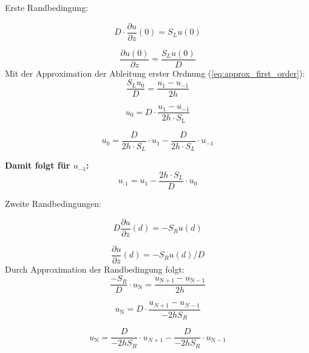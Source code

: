 Erste Randbedingung:

\begin{equation}
	D\cdot \frac{\partial u}{\partial z}(0)=S_Lu(0)
\end{equation}

\begin{equation}
	\frac{\partial u(0)}{\partial z}=\frac{S_Lu(0)}{D}
\end{equation}
Mit der Approximation der Ableitung erster Ordnung
(\cref{eq:approx_first_order}):
\begin{equation}
	\frac{S_Lu_0}{D} = \frac{u_1-u_{-1}}{2h}
\end{equation}

\begin{equation}
	u_0 = D\cdot \frac{u_1-u_{-1}}{2h\cdot S_\mathrm{L}}
\end{equation}

\begin{equation}
	u_0 = \frac{D}{2h\cdot S_L} \cdot u_1 - \frac{D}{2h\cdot S_L} \cdot
	u_{-1}
\end{equation}

\begin{qed}
	\textbf{Damit folgt für $u_{-1}$:}
	\begin{equation}\label{eq:rand_u-1}
		u_{\text{-}1} = u_1 - \frac{2h\cdot S_L}{D} \cdot u_0
	\end{equation}
\end{qed}

Zweite Randbedingungen:

\begin{equation}
	D\frac{\partial u}{\partial z}(d)=-S_Ru(d)
\end{equation}

\begin{equation}
	\frac{\partial u}{\partial z}(d)=-S_Ru(d)/D
\end{equation}
Durch Approximation der Randbedingung folgt:
\begin{equation}
	\frac{-S_R}{D}\cdot u_\mathrm{N} =
	\frac{u_{\mathrm{N}+1}-u_{\mathrm{N}-1}}{2h}
\end{equation}

\begin{equation}
	u_\mathrm{N} = D\cdot \frac{u_{N+1}-u_{N-1}}{-2hS_R}
\end{equation}

\begin{equation}
	u_\mathrm{N} = \frac{D}{-2hS_R} \cdot u_{N+1} - \frac{D}{-2hS_R} \cdot
	u_{\mathrm{N}-1}
\end{equation}

